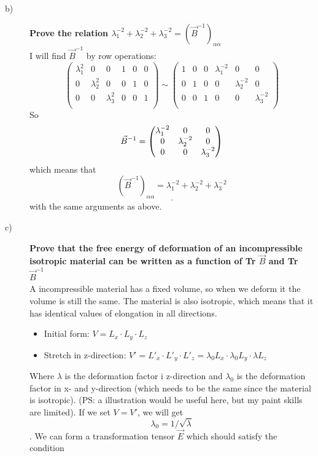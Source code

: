 \documentclass[norsk,a4paper,12pt]{article}
\begin{document}
\begin{description}
\item [b)] \textbf{Prove the relation $\lambda_1^{-2}+\lambda_2^{-2}+\lambda_3^{-2}=(\vec{B}^{-1})_{\alpha\alpha}$}\\
I will find $\vec{B}^{-1}$ by row operations:
\[
 \left(
  \begin{array}{ccc|ccc}
   \lambda_1^2 & 0 & 0 & 1 & 0 & 0 \\
   0 & \lambda_2^2 & 0 & 0 & 1 & 0 \\
   0 & 0 & \lambda_3^2 & 0 & 0 & 1 \\
  \end{array}
 \right)\sim
 \left(
  \begin{array}{ccc|ccc}
   1 & 0 & 0 & \lambda_1^{-2} & 0 & 0 \\
   0 & 1 & 0 & 0 & \lambda_2^{-2} & 0 \\
   0 & 0 & 1 & 0 & 0 & \lambda_3^{-2} \\
  \end{array}
 \right)
\]
So 
$$\vec{B}^{-1}=\mqty(\lambda_1^{-2}&0&0\\0&\lambda_2^{-2}&0\\0&0&\lambda_3^{-2})$$
which means that 
\begin{equation}
\underline{(\vec{B}^{-1})_{\alpha\alpha}=\lambda_1^{-2}+\lambda_2^{-2}+\lambda_3^{-2}}
\end{equation}
with the same arguments as above.
\item [c)] \textbf{Prove that the free energy of deformation of an incompressible isotropic material can be written as a function of Tr $\vec{B}$ and Tr $\vec{B}^{-1}$}\\
A incompressible material has a fixed volume, so when we deform it the volume is still the same. The material is also isotropic, which means that it has identical values of elongation in all directions.
\begin{itemize}
\item Initial form: $V=L_x\cdot L_y\cdot L_z$
\item Stretch in z-direction: $V'=L'_x\cdot L'_y\cdot L'_z=\lambda_0L_x\cdot\lambda_0L_y\cdot\lambda L_z$
\end{itemize}
Where $\lambda$ is the deformation factor i z-direction and $\lambda_0$ is the deformation factor in x- and y-direction (which needs to be the same since the material is isotropic). (PS: a illustration would be useful here, but my paint skills are limited). If we set $V=V'$, we will get
$$\lambda_0=1/\sqrt{\lambda}$$.
We can form a transformation tensor $\vec{E}$ which should satisfy the condition

\end{description}
\end{document}
